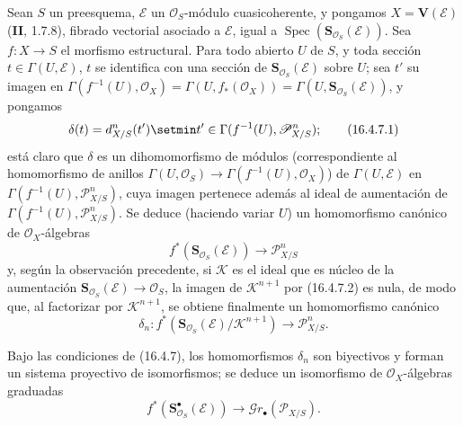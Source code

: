 \begin{env}[16.4.7]
\label{IV.16.4.7}
Sean $S$ un preesquema, $\mathscr{E}$ un $\mathcal{O}_S$-módulo
cuasicoherente, y pongamos $X=\mathbf{V}(\mathscr{E})$ (\textbf{II}, 1.7.8), fibrado
vectorial asociado a $\mathscr{E}$, igual a
$\operatorname{Spec}(\mathbf{S}_{\mathcal{O}_S}(\mathscr{E}))$. Sea
$f:X\to S$ el morfismo estructural. Para todo abierto $U$ de $S$, y toda
sección $t\in\Gamma(U,\mathscr{E})$, $t$ se identifica con una sección de
$\mathbf{S}_{\mathcal{O}_S}(\mathscr{E})$ sobre $U$; sea $t'$ su
imagen en
$\Gamma(f^{-1}(U),\mathcal{O}_X)=\Gamma(U,f_*(\mathcal{O}_X))=
\Gamma(U,\mathbf{S}_{\mathcal{O}_S}(\mathscr{E}))$, y pongamos
\[
  \delta(t)=d_{X/S}^n(t')\setmin t'\in
  \Gamma(f^{-1}(U),\mathscr{P}_{X/S}^n);
  \tag{16.4.7.1}
  \label{IV.16.4.7.1}
\]
está claro que $\delta$ es un dihomomorfismo de módulos (correspondiente al
homomorfismo de anillos
$\Gamma(U,\mathcal{O}_S)\to\Gamma(f^{-1}(U),\mathcal{O}_X)$) de
$\Gamma(U,\mathscr{E})$ en $\Gamma(f^{-1}(U),\mathscr{P}_{X/S}^n)$, cuya
imagen pertenece además al ideal de aumentación de
$\Gamma(f^{-1}(U),\mathscr{P}_{X/S}^n)$. Se deduce (haciendo variar $U$)
un homomorfismo canónico de $\mathcal{O}_X$-álgebras
\[
  f^*(\mathbf{S}_{\mathcal{O}_S}(\mathscr{E}))
  \longrightarrow\mathscr{P}_{X/S}^n
  \tag{16.4.7.2}
  \label{IV.16.4.7.2}
\]
y, según la observación precedente, si $\mathscr{K}$ es el ideal que es núcleo de
la aumentación $\mathbf{S}_{\mathcal{O}_S}(\mathscr{E})\to\mathcal{O}_S$,
la imagen de $\mathscr{K}^{n+1}$ por (16.4.7.2) es nula, de modo que, al
factorizar por $\mathscr{K}^{n+1}$, se obtiene finalmente un homomorfismo canónico
\[
  \delta_n:f^*(\mathbf{S}_{\mathcal{O}_S}(\mathscr{E})/
  \mathscr{K}^{n+1})\longrightarrow\mathscr{P}_{X/S}^n.
  \tag{16.4.7.3}
  \label{IV.16.4.7.3}
\]
\end{env}

\begin{proposition}[16.4.8]
\label{IV.16.4.8}
Bajo las condiciones de \textup{(16.4.7)}, los homomorfismos $\delta_n$ son biyectivos y
forman un sistema proyectivo de isomorfismos; se deduce un isomorfismo de
$\mathcal{O}_X$-álgebras graduadas
\[
  f^*(\mathbf{S}_{\mathcal{O}_S}^{\bullet}(\mathscr{E}))
  \longrightarrow\mathscr{G}r_\bullet(\mathscr{P}_{X/S}).
  \tag{16.4.8.1}
  \label{IV.16.4.8.1}
\]
\end{proposition}

